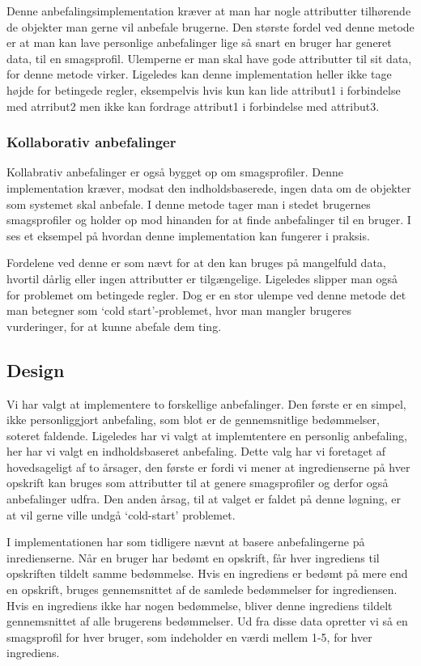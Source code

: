 Denne anbefalingsimplementation kræver at man har nogle attributter tilhørende de objekter man gerne vil anbefale brugerne.
Den største fordel ved denne metode  er at man kan lave personlige anbefalinger lige så snart en bruger har generet data, til en smagsprofil.
Ulemperne er man skal have gode attributter til sit data, for denne metode virker. Ligeledes kan denne implementation heller ikke tage højde for betingede regler, eksempelvis hvis kun kan lide attribut1 i forbindelse med atrribut2 men ikke kan fordrage attribut1 i forbindelse med attribut3.


\subsubsection{Kollaborativ anbefalinger}
Kollabrativ anbefalinger er også bygget op om smagsprofiler.
Denne implementation kræver, modsat den indholdsbaserede, ingen data om de objekter som systemet skal anbefale. I denne metode tager man i stedet brugernes smagsprofiler og holder op mod hinanden for at finde anbefalinger til en bruger. I  ses et eksempel på hvordan denne implementation kan fungerer i praksis.

Fordelene ved denne er som nævt for at den kan bruges på mangelfuld data, hvortil dårlig eller ingen attributter er tilgængelige.
Ligeledes slipper man også for problemet om betingede regler.
Dog er en stor ulempe ved denne metode det man betegner som ‘cold start’-problemet, hvor man mangler brugeres vurderinger, for at kunne abefale dem ting\citep{RecommenderSystems}.


\subsection{Design}
Vi har valgt at implementere to forskellige anbefalinger.
Den første er en simpel, ikke personliggjort anbefaling, som blot er de gennemsnitlige bedømmelser, soteret faldende.
Ligeledes har vi valgt at implemtentere en personlig anbefaling, her har vi valgt en indholdsbaseret anbefaling.
Dette valg har vi foretaget af hovedsageligt af to årsager, den første er fordi vi mener at ingredienserne på hver opskrift kan bruges som attributter til at genere smagsprofiler og derfor også anbefalinger udfra.
Den anden årsag, til at valget er faldet på denne løgning, er at vil gerne ville undgå ‘cold-start’ problemet.

I implementationen har som tidligere nævnt at basere anbefalingerne på inredienserne.
Når en bruger har bedømt en opskrift, får hver ingrediens til opskriften tildelt samme bedømmelse.
Hvis en ingrediens er bedømt på mere end en opskrift, bruges gennemsnittet af de samlede bedømmelser for ingrediensen.
Hvis en ingrediens ikke har nogen bedømmelse, bliver denne ingrediens tildelt gennemsnittet af alle brugerens bedømmelser.
Ud fra disse data opretter vi så en smagsprofil for hver bruger, som indeholder en værdi mellem 1-5, for hver ingrediens.

